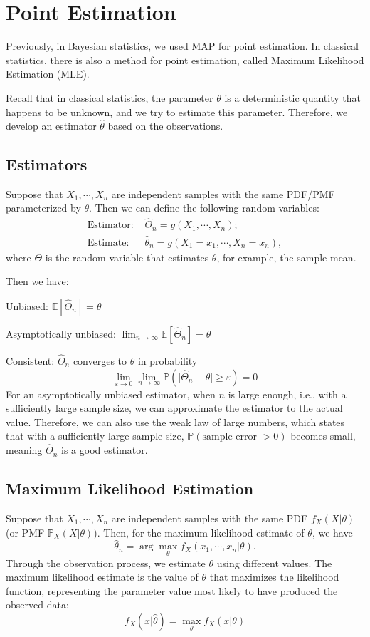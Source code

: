 \section{Point Estimation}

Previously, in Bayesian statistics, we used MAP for point estimation. In classical statistics, there is also a method for point estimation, called Maximum Likelihood Estimation (MLE). 

Recall that in classical statistics, the parameter \(\theta\) is a deterministic quantity that happens to be unknown, and we try to estimate this parameter. Therefore, we develop an estimator \(\hat{\theta}\) based on the observations.

\subsection{Estimators}
Suppose that \(X_1, \cdots, X_n\) are independent samples with the same PDF/PMF parameterized by \(\theta\). Then we can define the following random variables:
\[
\begin{aligned}
  \text{Estimator: } &\widehat{\Theta}_n = g(X_1, \cdots, X_n); \\
  \text{Estimate: } &\hat{\theta}_n = g(X_1 = x_1, \cdots, X_n = x_n),
\end{aligned}
\]
where \(\Theta\) is the random variable that estimates \(\theta\), for example, the sample mean. 

Then we have: 

Unbiased: \(\mathbb{E}[\widehat{\Theta}_n] = \theta\)

Asymptotically unbiased: \(\displaystyle\lim_{n \to \infty} \mathbb{E}[\widehat{\Theta}_n] = \theta\)

Consistent: \(\widehat{\Theta}_n\) converges to \(\theta\) in probability 
\[
  \lim_{\varepsilon \to 0} \lim_{n \to \infty} \mathbb{P}(\vert \widehat{\Theta}_n - \theta \vert \geq \varepsilon) = 0
\]
For an asymptotically unbiased estimator, when \(n\) is large enough, i.e., with a sufficiently large sample size, we can approximate the estimator to the actual value. Therefore, we can also use the weak law of large numbers, which states that with a sufficiently large sample size, \(\mathbb{P}(\text{sample error } > 0)\) becomes small, meaning \(\widehat{\Theta}_n\) is a good estimator.

\subsection{Maximum Likelihood Estimation}
Suppose that \(X_1, \cdots, X_n\) are independent samples with the same PDF \(f_X (X \vert \theta)\) (or PMF \(\mathbb{P}_X(X \vert \theta)\)). Then, for the maximum likelihood estimate of \(\theta\), we have 
\[
  \hat{\theta}_n = \arg \max_\theta f_X (x_1, \cdots, x_n \vert \theta).
\]
Through the observation process, we estimate \(\theta\) using different values. The maximum likelihood estimate is the value of \(\theta\) that maximizes the likelihood function, representing the parameter value most likely to have produced the observed data: 
\[
  f_X(x \vert \hat{\theta}) = \max_\theta f_X(x \vert \theta)
\]

